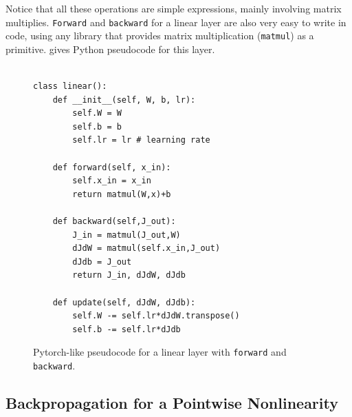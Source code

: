 
Notice that all these operations are simple expressions, mainly involving matrix multiplies. \texttt{Forward} and \texttt{backward} for a linear layer are also very easy to write in code, using any library that provides matrix multiplication (\texttt{matmul}) as a primitive. \Fig{\ref{fig:backpropagation:backprop_code}} gives Python pseudocode for this layer.
\begin{figure}[h]
    \begin{minipage}{1.0\linewidth}
        \begin{verbatim}

class linear():
    def __init__(self, W, b, lr):
        self.W = W
        self.b = b
        self.lr = lr # learning rate
        
    def forward(self, x_in):
        self.x_in = x_in
        return matmul(W,x)+b
    
    def backward(self,J_out):
        J_in = matmul(J_out,W)
        dJdW = matmul(self.x_in,J_out)
        dJdb = J_out
        return J_in, dJdW, dJdb
    
    def update(self, dJdW, dJdb):
        self.W -= self.lr*dJdW.transpose()
        self.b -= self.lr*dJdb
\end{verbatim}
    \end{minipage}
    \caption{Pytorch-like pseudocode for a linear layer with \texttt{forward} and \texttt{backward}.}
    \label{fig:backpropagation:backprop_code}
\end{figure}


\subsection{Backpropagation for a Pointwise Nonlinearity}

